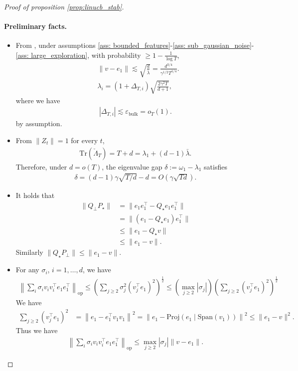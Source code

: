 \documentclass[11pt]{article}
\begin{document}
\begin{proof}[Proof of proposition \ref{prop:linucb_stab}]
\paragraph{Preliminary facts.} 
\begin{itemize}
    \item From \citet[Eq. (27), Eq. (28)]{fan2025statisticalinferenceadaptivesampling}, under assumptions \ref{ass: bounded_features}-\ref{ass: sub_gaussian_noise}-\ref{ass: large_exploration},  with probability $\geq 1 - \frac{1}{\log T}$, 
\begin{align}
    &\|v -  e_1 \| \lesssim \sqrt{\frac{d}{\bar \lambda}} = \frac{d^{3/4}}{\gamma^{1/2} T^{1/4}}.\\
    &\lambda_{i} = (1+\Delta_{T,i})\sqrt{\frac{2\gamma^2 T}{d + 1}},
\end{align}
where we have
\begin{align*}
    |\Delta_{T,i}| \lesssim \varepsilon_{\mathrm{bulk}} = o_T(1).
\end{align*}
by assumption.
    \item From $\|Z_t\| = 1$ for every $t$, 
    \begin{align*}
        \mathrm{Tr}(\check \Lambda_T) = T + d = \lambda_1 + (d - 1)\bar \lambda.
    \end{align*}
    Therefore, under $d=o(T)$, the eigenvalue gap $\delta := \omega_1 - \lambda_1$ satisfies
    \begin{align*}
        \delta = (d-1)\gamma\sqrt{T/d} - d = O(\gamma \sqrt{T d}). 
    \end{align*}
    \item It holds that
    \begin{align*}
        \| Q_\perp P_\star \| &= \| e_1 e_1^\top - Q_\star e_1 e_1^\top\| \\
        &= \| (e_1 - Q_\star e_1) e_1^\top \| \\
        &\leq \| e_1 - Q_\star v \| \\
        &\leq \| e_1 - v\|.
    \end{align*}
    Similarly $\| Q_\star P_\perp  \| \leq \| e_1 - v\|$.
    \item For any $\sigma_i$, $i=1,\ldots,d$, we have
    \begin{align*}
        \left\lVert \sum_i \sigma_i v_i v_i^\top e_1 e_1^\top \right\rVert_{\mathrm{op}} \leq \left(\sum_{j\geq 2}\sigma_j^2 (v_j^{\top}e_1)^2\right)^{\frac{1}{2}} \leq \left(\max_{j\geq 2}|\sigma_j|\right)\left(\sum_{j\geq 2}(v_j^{\top}e_1)^2\right)^{\frac{1}{2}}
    \end{align*}
    We have
    \begin{align*}
        \sum_{j\geq 2}(v_j^{\top}e_1)^2 &= \left\|e_1 - e_1^\top v_1 v_1\right\|^2 = \left\|e_1 - \mathrm{Proj}(e_1\mid \mathrm{Span}(v_1))\right\|^2 \leq \|e_1 - v\|^2. 
    \end{align*}
    Thus we have
    \begin{align}
        \left\lVert \sum_i \sigma_i v_i v_i^\top e_1 e_1^\top \right\rVert_{\mathrm{op}} \leq \max_{j\geq 2}|\sigma_j|\|v - e_1\|. \label{eq:rotation_bound}
    \end{align}
\end{itemize}


\end{proof}
\end{document}
